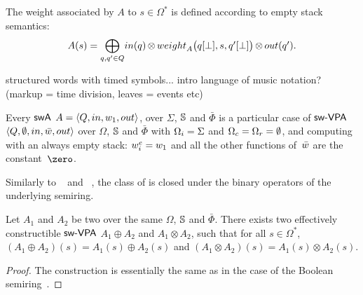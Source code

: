 %

\noindent
The weight associated by $A$ to $s \in \Omega^*$
is defined according to empty stack semantics:
%
\begin{equation}
A(s)  =
{\displaystyle\bigoplus_{q, q' \in Q}} \textstyle
\mathsf{in}(q) \mathop{\otimes}
\weight_A\bigl(\config{q}{\bot}, s, \config{q'}{\bot}\bigr)
\mathop{\otimes} \mathsf{out}(q').
\label{eq:SWVPA-value}
\end{equation}

\begin{example}
structured words with timed symbols...
intro language of music notation? (markup = time division, leaves = events etc)
\end{example}

\noindent
Every $\textsf{swA}$ $A = \< Q, \init, {\wei_1}, \final >$,
over $\Sigma$, $\mathbb{S}$ and $\bar\Phi$
is a particular case of $\textsf{sw-VPA}$
$\< Q, \emptyset, \init, \bar\wei, \final >$
over $\Omega$, $\mathbb{S}$ and $\bar\Phi$
with $\Omegai = \Sigma$ and $\Omegac = \Omegar = \emptyset$,
and computing with an always empty stack:
$\weiei = \wei_1$ and all the other functions
of~$\bar\wei$ are the constant~$\zero$.


\medskip\noindent
Similarly to \VPA~\cite{AlurMadhusudan09nested}
and \SVPA~\cite{dAntonyAlur14SVPDA},
the class of \SWVPA is closed under the binary operators of the underlying semiring.
%
\begin{proposition}\label{prop:SWVPA-product}
Let $A_1$ and $A_2$ be two \SWVPA
over the same $\Omega$, $\mathbb{S}$ and $\bar\Phi$.
There exists two effectively constructible $\textsf{sw-VPA}$
$A_1 \oplus A_2$ and $A_1 \otimes A_2$,
such that for all $s \in \Omega^*$,
$(A_1 \oplus A_2)(s) = A_1(s) \oplus A_2(s)$ and
$(A_1 \otimes A_2)(s) = A_1(s) \otimes A_2(s)$.
\end{proposition}
%
\begin{proof}
The construction is essentially the same
as in the case of the Boolean semiring~\cite{dAntonyAlur14SVPDA}.
\end{proof}

